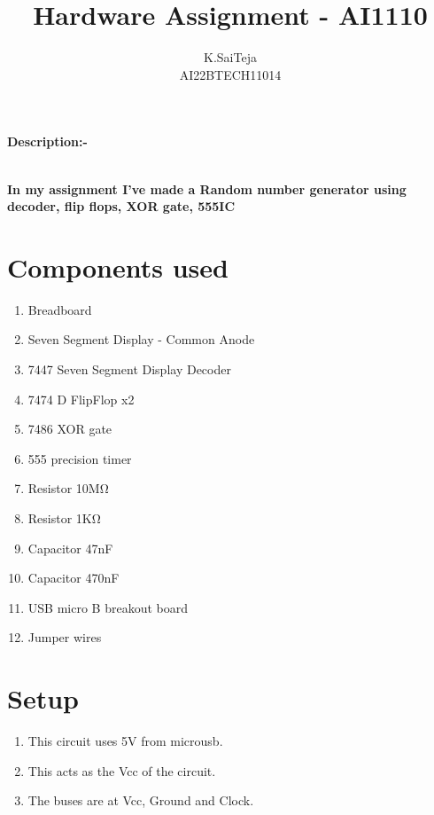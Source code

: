 \documentclass[journal,12pt,twocolumn]{IEEEtran}
\begin{document}
		\title{
				Hardware Assignment - AI1110
		}
		\author{K.SaiTeja\\
			AI22BTECH11014
		}	
		
\maketitle

\newpage
\bigskip
\renewcommand{\thefigure}{\theenumi}
\renewcommand{\thetable}{\theenumi}
\textbf{Description:-} \raggedright\\
\textbf{In my assignment I've made a Random number generator using decoder, flip flops, XOR gate, 555IC}
\tableofcontents
\section{Components used}
\begin{enumerate}[label=(\roman*)]
\item Breadboard
\item Seven Segment Display - Common Anode
\item 7447 Seven Segment Display Decoder
\item 7474 D FlipFlop x2
\item 7486 XOR gate
\item 555 precision timer
\item Resistor 10MΩ
\item Resistor 1KΩ
\item Capacitor 47nF
\item Capacitor 470nF
\item USB micro B breakout board
\item Jumper wires
\end{enumerate}
\section{Setup}
\begin{enumerate}
\item This circuit uses 5V from microusb.
\item This acts as the Vcc of the circuit.
\item The buses are at Vcc, Ground and Clock.
\end{enumerate}
\end{document}
